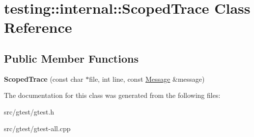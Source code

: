 \hypertarget{classtesting_1_1internal_1_1_scoped_trace}{}\section{testing\+:\+:internal\+:\+:Scoped\+Trace Class Reference}
\label{classtesting_1_1internal_1_1_scoped_trace}
\subsection*{Public Member Functions}
\begin{DoxyCompactItemize}
\item 
\mbox{\label{classtesting_1_1internal_1_1_scoped_trace_ab965d7010bbbc82c1bef6ebf8748bede}} 
{\bfseries Scoped\+Trace} (const char $\ast$file, int line, const \mbox{\hyperlink{classtesting_1_1_message}{Message}} \&message)
\end{DoxyCompactItemize}


The documentation for this class was generated from the following files\+:\begin{DoxyCompactItemize}
\item 
src/gtest/gtest.\+h\item 
src/gtest/gtest-\/all.\+cpp\end{DoxyCompactItemize}
